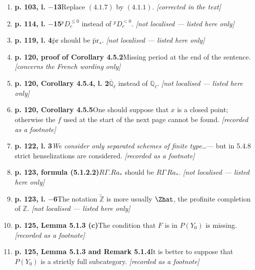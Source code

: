 \documentclass[12pt,oneside]{amsbook}
\theoremstyle{plain}
\theoremstyle{definition}
\newcommand{\ZZ}{\mathbb{Z}}  \newcommand{\QQ}{\mathbb{Q}}
\newcommand{\Ql}{\mathbb{Q}_{\ell}}
\newcommand{\Qlb}{\overline{\mathbb{Q}}_{\ell}}
\begin{document}
\begin{enumerate}[label={\arabic*.},leftmargin=2.6em,itemsep=4pt]
\item \textbf{p. 103, l. $-$13}\quad Replace $(4.1.7)$ by $(4.1.1)$. \hfill\newline \textsl{[corrected in the text]}
\item \textbf{p. 114, l. $-$15}\quad ${}^{p}D_{c}^{\leq0}$ instead of ${}^{p}D_{c}^{<0}$. \hfill\newline \textsl{[not localised --- listed here only]}
\item \textbf{p. 119, l. 4}\quad $\widetilde{\mathrm{pr}}$ should be $\widetilde{\mathrm{pr}}_{*}$. \hfill\newline \textsl{[not localised --- listed here only]}
\item \textbf{p. 120, proof of Corollary 4.5.2}\quad Missing period at the end of the sentence. \hfill\newline \textsl{[concerns the French wording only]}
\item \textbf{p. 120, Corollary 4.5.4, l. 2}\quad $\Qlb$ instead of $\Ql$. \hfill\newline \textsl{[not localised --- listed here only]}
\item \textbf{p. 120, Corollary 4.5.5}\quad One should suppose that $x$ is a closed point; otherwise the $f$ used at the start of the next page cannot be found. \hfill\newline \textsl{[recorded as a footnote]}
\item \textbf{p. 122, l. 3}\quad \emph{We consider only separated schemes of finite type}\dots --- but in 5.4.8 strict henselizations are considered. \hfill\newline \textsl{[recorded as a footnote]}
\item \textbf{p. 123, formula (5.1.2.2)}\quad $R\Gamma.Ra_{*}$ should be $R\Gamma\,Ra_{*}$. \hfill\newline \textsl{[not localised --- listed here only]}
\item \textbf{p. 123, l. $-$6}\quad The notation $\widetilde{\ZZ}$ is more usually $\Zhat$, the profinite completion of $\ZZ$. \hfill\newline \textsl{[not localised --- listed here only]}
\item \textbf{p. 125, Lemma 5.1.3 (c)}\quad The condition that $F$ is in $P(Y_{0})$ is missing. \hfill\newline \textsl{[recorded as a footnote]}
\item \textbf{p. 125, Lemma 5.1.3 and Remark 5.1.4}\quad It is better to suppose that $P(Y_{0})$ is a strictly full subcategory. \hfill\newline \textsl{[recorded as a footnote]}

\end{enumerate}
\end{document}
